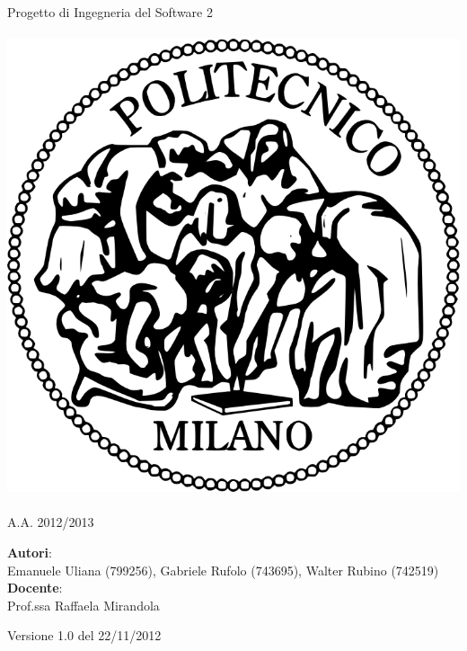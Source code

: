 \documentclass[a4paper,12pt]{article}
\begin{document}
\vspace*{\fill}
\begin{center}
{\fontsize{28}{10} \selectfont Progetto di Ingegneria del Software 2 \\[2\baselineskip]} {\fontsize{42}{10} \selectfont {\bfseries SWIMv2}} \\[4\baselineskip]
\includegraphics[scale=0.4]{polimi} \\[4\baselineskip]
{\fontsize{28}{10} \selectfont {\bfseries Requirements Analysis Specification Document} \\[2\baselineskip] A.A. 2012/2013}
\end{center}
\begin{flushleft}
{\fontsize{18}{10}
{\bfseries Autori}: \\ Emanuele Uliana (799256), Gabriele Rufolo (743695), Walter Rubino (742519) \\[1\baselineskip]
{\bfseries Docente}: \\ Prof.ssa Raffaela Mirandola
}
\end{flushleft}
\vspace*{\fill}
\begin{center}
Versione 1.0 del 22/11/2012 \\
\end{center}

\clearpage
\end{document}
